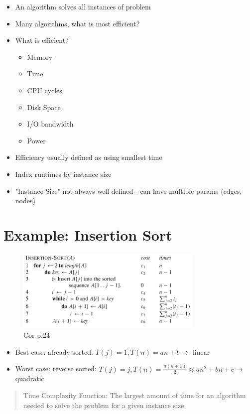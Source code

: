 \documentclass[12pt, letter]{article}
\begin{document}
\begin{itemize}
	\item An algorithm solves all instances of problem
	\item Many algorithms, what is most efficient?
	\item What is efficient?
	\begin{itemize}
		\item Memory
		\item Time
		\item CPU cycles
		\item Disk Space
		\item I/O bandwidth
		\item Power
	\end{itemize}
	\item Efficiency usually defined as using smallest time
	\item Index runtimes by instance size
	\item "Instance Size" not always well defined - can have multiple params (edges, nodes)
\end{itemize}

\section{Example: Insertion Sort}%
\label{sec:example_insertion_sort}

\begin{figure}[h]
	\centering
	\includegraphics[width=0.8\textwidth]{imgs/insertion_sort.png}
	\caption{Cor p.24}
	\label{fig:imgs-insertion_sort-png}
\end{figure}
\begin{itemize}
	\item Best case: already sorted. $T(j)=1, T(n)=an+b \rightarrow$ linear
	\item Worst case: reverse sorted: $T(j)=j, T(n) = \frac{n(n+1)}{2} \approx an^2+bn+c\rightarrow$ quadratic
\end{itemize}

\begin{quote}
	Time Complexity Function: The largest amount of time for an algorithm needed to solve the problem for a given instance size.
\end{quote}
\end{document}
